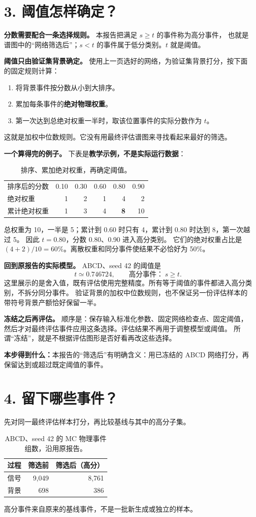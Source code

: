 \documentclass[11pt,a4paper,fontset=fandol,scheme=plain]{ctexart}
\newcommand{\reportsection}[1]{\section*{\textcolor{reportblue}{#1}}}
\newcommand{\takeaway}[1]{\par\medskip\noindent\colorbox{reportblue!7}{\parbox{\dimexpr\linewidth-2\fboxsep\relax}{\textbf{本步得到什么：}#1}}\par}
\begin{document}
\clearpage
\reportsection{3. 阈值怎样确定？}
\textbf{分数需要配合一条选择规则。} 本报告把满足 $s\geq t$ 的事件称为高分事件，
也就是谱图中的“网络筛选后”；$s<t$ 的事件属于低分类别。$t$ 就是阈值。

\textbf{阈值只由验证集背景确定。} 使用上一页选好的网络，为验证集背景打分，按下面的固定规则计算：
\begin{enumerate}
\item 将背景事件按分数从小到大排序。
\item 累加每条事件的\textbf{绝对物理权重}。
\item 第一次达到总绝对权重一半时，取该位置事件的实际分数作为 $t$。
\end{enumerate}
这就是加权中位数规则。它没有用最终评估谱图来寻找看起来最好的筛选。

\textbf{一个算得完的例子。} 下表是\textbf{教学示例，不是实际运行数据}：
\begin{table}[H]
\caption{排序、累加绝对权重，再确定阈值。}
\centering
\renewcommand{\arraystretch}{1.3}
\begin{tabular}{lrrrrr}
\toprule
排序后的分数 & 0.10 & 0.30 & 0.60 & 0.80 & 0.90\\
绝对权重 & 1 & 2 & 1 & 4 & 2\\
累计绝对权重 & 1 & 3 & 4 & \textbf{8} & 10\\
\bottomrule
\end{tabular}
\end{table}
总权重为 10，一半是 5；累计到 0.60 时只有 4，累计到 0.80 时达到 8，第一次越过 5。
因此 $t=0.80$，分数 0.80、0.90 进入高分类别。
它们的绝对权重占比是 $(4+2)/10=60\%$。离散权重和同分事件使结果不必恰好为 50\%。

\textbf{回到原报告的实际模型。} ABCD、seed 42 的阈值是
\[
 \boxed{t\simeq0.746724},\qquad
 \text{高分事件：}\ s\geq t.
\]
这里展示的是舍入值，既有评估使用完整精度。所有等于阈值的事件都进入高分类别，不拆分同分事件。
验证背景的加权中位数规则，也不保证另一份评估样本的带符号背景产额恰好保留一半。

\textbf{冻结之后再评估。} 顺序是：保存输入标准化参数、固定网络检查点、固定阈值，
然后才对最终评估事件应用这条选择。评估结果不再用于调整模型或阈值。
所谓“冻结”，就是不根据评估图形是否好看再改这些选择。

\takeaway{本报告的“筛选后”有明确含义：用已冻结的 ABCD 网络打分，再保留达到或超过既定阈值的事件。}

\clearpage
\reportsection{4. 留下哪些事件？}
先对同一最终评估样本打分，再比较基线与其中的高分子集。
\begin{table}[H]
\caption{ABCD、seed 42 的 MC 物理事件组数，沿用原报告。}
\centering
\renewcommand{\arraystretch}{1.25}
\begin{tabular}{lrr}
\toprule
过程 & 筛选前 & 筛选后（高分）\\
\midrule
信号 & 9,049 & 8,761\\
背景 & 698 & 386\\
\bottomrule
\end{tabular}
\end{table}
高分事件来自原来的基线事件，不是一批新生成或独立的样本。
\end{document}
